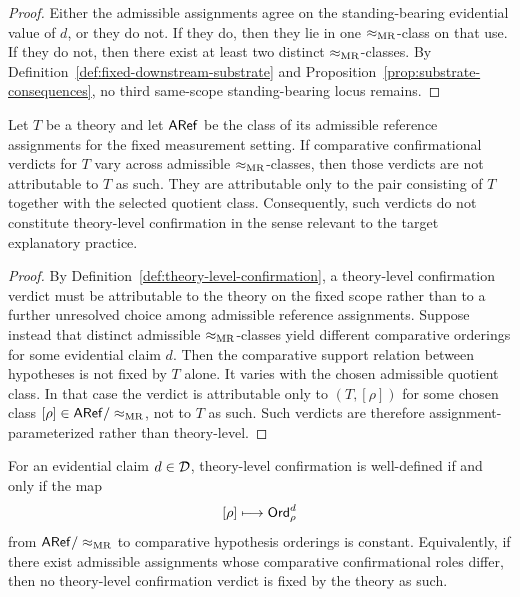 \begin{proof}
Either the admissible assignments agree on the standing-bearing evidential value of $d$, or they do
not. If they do, then they lie in one $\mathrel{\approx_{\mathrm{MR}}}$-class on that use. If they do not, then there exist at
least two distinct $\mathrel{\approx_{\mathrm{MR}}}$-classes. By
Definition~\ref{def:fixed-downstream-substrate} and Proposition~\ref{prop:substrate-consequences},
no third same-scope standing-bearing locus remains.
\end{proof}

\begin{theorem}
\label{thm:no-auxiliary-parameterization}
Let $T$ be a theory and let $\mathsf{ARef}$ be the class of its admissible reference assignments for the fixed
measurement setting. If comparative confirmational verdicts for $T$ vary across admissible
$\mathrel{\approx_{\mathrm{MR}}}$-classes, then those verdicts are not attributable to $T$ as such. They are attributable only to
the pair consisting of $T$ together with the selected quotient class. Consequently, such verdicts do not
constitute theory-level confirmation in the sense relevant to the target explanatory practice.
\end{theorem}

\begin{proof}
By Definition~\ref{def:theory-level-confirmation}, a theory-level confirmation verdict must be
attributable to the theory on the fixed scope rather than to a further unresolved choice among
admissible reference assignments. Suppose instead that distinct admissible $\mathrel{\approx_{\mathrm{MR}}}$-classes yield
different comparative orderings for some evidential claim $d$. Then the comparative support relation
between hypotheses is not fixed by $T$ alone. It varies with the chosen admissible quotient class. In
that case the verdict is attributable only to $(T,[\rho])$ for some chosen class $[\rho]\in\mathsf{ARef}/\mathrel{\approx_{\mathrm{MR}}}$,
not to $T$ as such. Such verdicts are therefore assignment-parameterized rather than theory-level.
\end{proof}

\begin{theorem}
\label{thm:theory-level-confirmation-criterion}
For an evidential claim $d\in\mathcal{D}$, theory-level confirmation is well-defined if and only if the map
\[
[\rho] \longmapsto \mathsf{Ord}_\rho^d
\]
from $\mathsf{ARef}/\mathrel{\approx_{\mathrm{MR}}}$ to comparative hypothesis orderings is constant. Equivalently, if there exist
admissible assignments whose comparative confirmational roles differ, then no theory-level
confirmation verdict is fixed by the theory as such.
\end{theorem}

